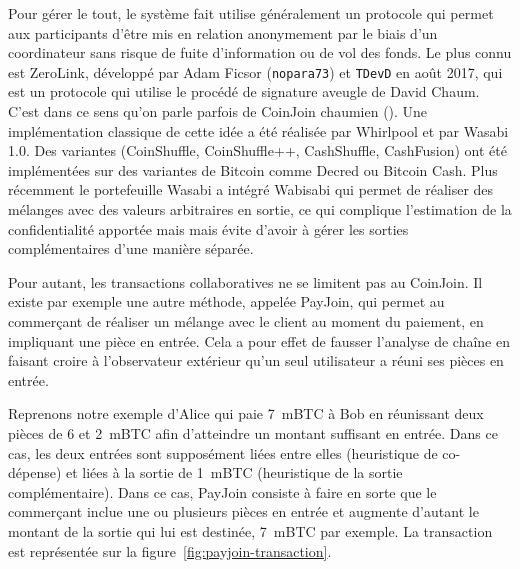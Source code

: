 Pour gérer le tout, le système fait utilise généralement un protocole qui permet aux participants d'être mis en relation anonymement par le biais d'un coordinateur sans risque de fuite d'information ou de vol des fonds. Le plus connu est ZeroLink, développé par Adam Ficsor (\texttt{nopara73}) et \texttt{TDevD} en août 2017, qui est un protocole qui utilise le procédé de signature aveugle de David Chaum. C'est dans ce sens qu'on parle parfois de CoinJoin chaumien (). Une implémentation classique de cette idée a été réalisée par Whirlpool et par Wasabi 1.0. Des variantes (CoinShuffle, CoinShuffle++, CashShuffle, CashFusion) ont été implémentées sur des variantes de Bitcoin comme Decred ou Bitcoin Cash. Plus récemment le portefeuille Wasabi a intégré Wabisabi qui permet de réaliser des mélanges avec des valeurs arbitraires en sortie, ce qui complique l'estimation de la confidentialité apportée mais mais évite d'avoir à gérer les sorties complémentaires d'une manière séparée.

Pour autant, les transactions collaboratives ne se limitent pas au CoinJoin. Il existe par exemple une autre méthode, appelée PayJoin, qui permet au commerçant de réaliser un mélange avec le client au moment du paiement, en impliquant une pièce en entrée. Cela a pour effet de fausser l'analyse de chaîne en faisant croire à l'observateur extérieur qu'un seul utilisateur a réuni ses pièces en entrée.

Reprenons notre exemple d'Alice qui paie 7~mBTC à Bob en réunissant deux pièces de 6 et 2~mBTC afin d'atteindre un montant suffisant en entrée. Dans ce cas, les deux entrées sont supposément liées entre elles (heuristique de co-dépense) et liées à la sortie de 1~mBTC (heuristique de la sortie complémentaire). Dans ce cas, PayJoin consiste à faire en sorte que le commerçant inclue une ou plusieurs pièces en entrée et augmente d'autant le montant de la sortie qui lui est destinée, 7~mBTC par exemple. La transaction est représentée sur la figure~\ref{fig:payjoin-transaction}.


